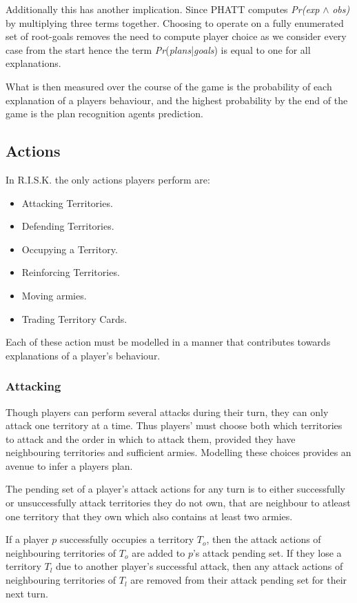 \documentclass[parskip]{cs4rep}
\begin{document}
Additionally this has another implication. Since PHATT computes \textit{Pr(exp} $\wedge$ \textit{obs)} by multiplying three terms together. Choosing to operate on a fully enumerated set of root-goals removes the need to compute player choice as we consider every case from the start hence the term \textit{Pr}(\textit{plans}|\textit{goals}) is equal to one for all explanations.

What is then measured over the course of the game is the probability of each explanation of a players behaviour, and the highest probability by the end of the game is the plan recognition agents prediction.

\subsection{Actions}

In R.I.S.K. the only actions players perform are:

\begin{itemize}
\item
Attacking Territories.
\item
Defending Territories.
\item
Occupying a Territory.
\item
Reinforcing Territories.
\item
Moving armies.
\item
Trading Territory Cards.
\end{itemize}

Each of these action must be modelled in a manner that contributes towards explanations of a player's behaviour.

\subsubsection{Attacking}

Though players can perform several attacks during their turn, they can only attack one territory at a time. Thus players' must choose both which territories to attack and the order in which to attack them, provided they have neighbouring territories and sufficient armies. Modelling these choices provides an avenue to infer a players plan.

The pending set of a player's attack actions for any turn is to either successfully or unsuccessfully attack territories they do not own, that are neighbour to atleast one territory that they own which also contains at least two armies.

If a player $p$ successfully occupies a territory $T_{o}$, then the attack actions of neighbouring territories of $T_{o}$ are added to $p$'s attack pending set. If they lose a territory $T_{l}$ due to another player's successful attack, then any attack actions of neighbouring territories of $T_{l}$ are removed from their attack pending set for their next turn. 
\end{document}
